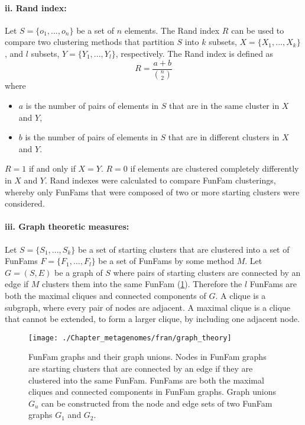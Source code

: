 \paragraph{ii. Rand index:}

Let $S = \{o_1, ..., o_n\}$ be a set of $n$ elements.
The Rand index $R$ can be used to compare two clustering methods that partition $S$
into $k$ subsets, $X = \{X_1, ..., X_k\}$,
and $l$ subsets, $Y = \{Y_1, ..., Y_l\}$, respectively.
The Rand index is defined as
\[ R = \frac{a+b}{{n \choose 2}} \]
where
\begin{itemize}
    \item $a$ is the number of pairs of elements in $S$ that are in the same cluster in $X$ and $Y$,
    \item $b$ is the number of pairs of elements in $S$ that are in different clusters in $X$ and $Y$.
\end{itemize}
$R = 1$ if and only if $X = Y$. $R = 0$ if elements are clustered completely differently in $X$ and $Y$.
Rand indexes were calculated to compare FunFam clusterings, whereby only FunFams that were composed of two or more starting clusters were considered.

\paragraph{iii. Graph theoretic measures:}

Let $S = \{S_1, ..., S_k\}$ be a set of starting clusters that are clustered into a set of FunFams
$F = \{F_1, ..., F_l\}$ be a set of FunFams
by some method $M$.
Let $G = (S, E)$ be a graph of $S$ where pairs of starting clusters are connected by an edge if $M$ clusters them into the same FunFam (\ref{fig:fran-graph-theory}).
Therefore the $l$ FunFams are both the maximal cliques and connected components of $G$.
A clique is a subgraph, where every pair of nodes are adjacent.
A maximal clique is a clique that cannot be extended, to form a larger clique, by including one adjacent node.

\begin{figure}[!hbt]
    \centering
    \texttt{[image: ./Chapter\_metagenomes/fran/graph\_theory]}
    \caption{%
        FunFam graphs and their graph unions.
        Nodes in FunFam graphs are starting clusters that are connected by an edge if they are clustered into the same FunFam.
        FunFams are both the maximal cliques and connected components in FunFam graphs.
        Graph unions $G_u$ can be constructed from the node and edge sets of two FunFam graphs $G_1$ and $G_2$.
    }
    \label{fig:fran-graph-theory}
\end{figure}

